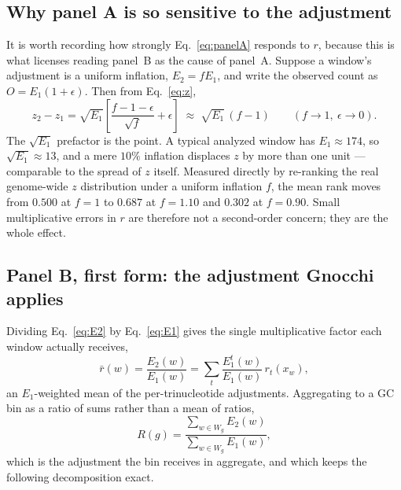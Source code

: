 \documentclass{article}
\begin{document}
\subsection{Why panel A is so sensitive to the adjustment}

It is worth recording how strongly Eq.~\eqref{eq:panelA} responds to $r$, because
this is what licenses reading panel~B as the cause of panel~A. Suppose a window's
adjustment is a uniform inflation, $E_2 = f E_1$, and write the observed count as
$O = E_1(1+\epsilon)$. Then from Eq.~\eqref{eq:z},
\begin{equation}
    z_2 - z_1 = \sqrt{E_1}\left[\frac{f - 1 - \epsilon}{\sqrt{f}} + \epsilon\right]
              \;\approx\; \sqrt{E_1}\,(f-1)
    \qquad (f \to 1,\ \epsilon \to 0).
    \label{eq:sensitivity}
\end{equation}
The $\sqrt{E_1}$ prefactor is the point. A typical analyzed window has
$E_1 \approx 174$, so $\sqrt{E_1} \approx 13$, and a mere $10\%$ inflation
displaces $z$ by more than one unit --- comparable to the spread of $z$ itself.
Measured directly by re-ranking the real genome-wide $z$ distribution under a
uniform inflation $f$, the mean rank moves from $0.500$ at $f=1$ to $0.687$ at
$f=1.10$ and $0.302$ at $f=0.90$. Small multiplicative errors in $r$ are therefore
not a second-order concern; they are the whole effect.

\subsection{Panel B, first form: the adjustment Gnocchi applies}

Dividing Eq.~\eqref{eq:E2} by Eq.~\eqref{eq:E1} gives the single multiplicative
factor each window actually receives,
\begin{equation}
    \bar{r}(w) = \frac{E_2(w)}{E_1(w)}
               = \sum_t \frac{E_1^{t}(w)}{E_1(w)}\, r_t(x_w),
\end{equation}
an $E_1$-weighted mean of the per-trinucleotide adjustments. Aggregating to a GC
bin as a ratio of sums rather than a mean of ratios,
\begin{equation}
    R(g) = \frac{\sum_{w \in W_g} E_2(w)}{\sum_{w \in W_g} E_1(w)},
    \label{eq:Rg}
\end{equation}
which is the adjustment the bin receives in aggregate, and which keeps the
following decomposition exact.
\end{document}
